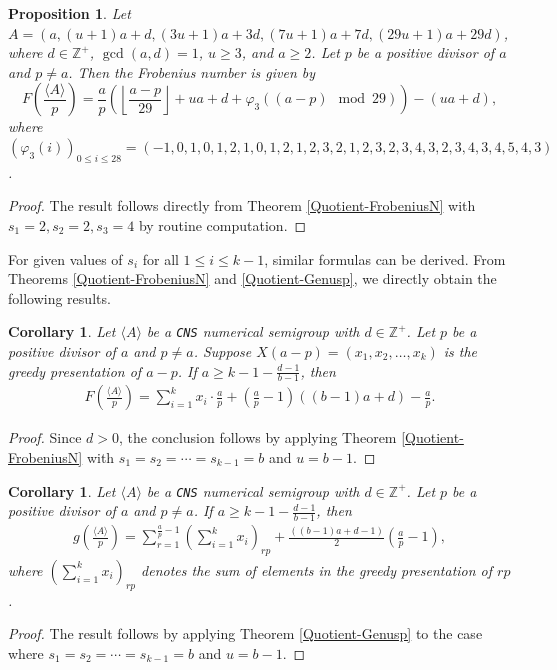 \documentclass[reqno, 12pt]{article}
\newtheorem{cor}[thm]{Corollary}
\newtheorem{prop}[thm]{Proposition}
\theoremstyle{mydefinition}
\theoremstyle{myremark}
\numberwithin{algorithm}{section}
\begin{document}
\begin{prop}
Let $A=(a, (u+1)a+d, (3u+1)a+3d, (7u+1)a+7d, (29u+1)a+29d)$, where $d\in \mathbb{Z}^{+}$, $\gcd(a,d)=1$, $u\geq 3$, and $a\geq 2$. 
Let $p$ be a positive divisor of $a$ and $p\neq a$. Then the Frobenius number is given by
$$F\left(\frac{\langle A\rangle}{p}\right)=\frac{a}{p}\left(\left\lfloor \frac{a-p}{29}\right\rfloor +ua+d+\varphi_3((a-p) \mod 29)\right)-(ua+d),$$
where $(\varphi_3(i))_{0\leq i \leq 28} =(-1,0,1,0,1,2,1,0,1,2,1,2,3,2,1,2,3,2,3,4,3,2,3,4,3,4,5,4,3)$.
\end{prop}
\begin{proof}
The result follows directly from Theorem \ref{Quotient-FrobeniusN} with $s_1=2,s_2=2,s_3=4$ by routine computation.
\end{proof}




For given values of $s_i$ for all $1\leq i\leq k-1$, similar formulas can be derived.
From Theorems \ref{Quotient-FrobeniusN} and \ref{Quotient-Genusp}, we directly obtain the following results.
\begin{cor}\label{Quotient-CNS-Frobenius}
Let $\langle A\rangle$ be a \texttt{CNS} numerical semigroup with $d\in\mathbb{Z}^{+}$. Let $p$ be a positive divisor of $a$ and $p\neq a$.
Suppose $X(a-p)=(x_1,x_2,\ldots,x_k)$ is the greedy presentation of $a-p$.
If $a\geq k-1-\frac{d-1}{b-1}$, then
\begin{align*}
F\left(\frac{\langle A\rangle}{p}\right)= \sum_{i=1}^kx_i \cdot \frac{a}{p} +\left(\frac{a}{p}-1\right)((b-1)a+d)-\frac{a}{p}.
\end{align*}
\end{cor}
\begin{proof}
Since $d > 0$, the conclusion follows by applying Theorem \ref{Quotient-FrobeniusN} with $s_1=s_2=\cdots=s_{k-1}=b$ and $u=b-1$.
\end{proof}

\begin{cor}\label{Quotient-CNS-Genus}
Let $\langle A\rangle$ be a \texttt{CNS} numerical semigroup with $d\in\mathbb{Z}^{+}$. Let $p$ be a positive divisor of $a$ and $p\neq a$.
If $a\geq k-1-\frac{d-1}{b-1}$, then
\begin{align*}
g\left(\frac{\langle A\rangle}{p}\right)
=\sum_{r=1}^{\frac{a}{p}-1}\left(\sum_{i=1}^kx_i\right)_{rp}+\frac{((b-1)a+d-1)}{2}\left(\frac{a}{p}-1\right),
\end{align*}
where $\left(\sum_{i=1}^{k}x_i\right)_{rp}$ denotes the sum of elements in the greedy presentation of $rp$.
\end{cor}
\begin{proof}
The result follows by applying Theorem \ref{Quotient-Genusp} to the case where $s_1=s_2=\cdots =s_{k-1}=b$ and $u=b-1$.
\end{proof}
\end{document}
